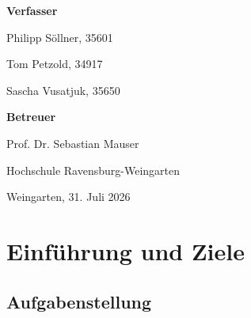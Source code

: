\documentclass[a4paper,11pt]{article}
\begin{document}
\begin{titlepage}
\begin{minipage}[t]{0.52\textwidth}
  \textbf{Verfasser}\par
  \vspace{0.3cm}

  Philipp Söllner, 35601\par
  \vspace{0.2cm}

  Tom Petzold, 34917\par
  \vspace{0.2cm}

  Sascha Vusatjuk, 35650\par
\end{minipage}
\hfill
\begin{minipage}[t]{0.42\textwidth}
  \raggedright
  \large

  \textbf{Betreuer}\par
  \vspace{0.3cm}

  Prof. Dr. Sebastian Mauser\par
  Hochschule Ravensburg-Weingarten\par
\end{minipage}

\vfill

\begin{center}
  {\large Weingarten, 31. Juli 2026}
\end{center}

\end{titlepage}

\hypersetup{pageanchor=true}






\thispagestyle{plain}
\tableofcontents
\clearpage

\setcounter{page}{1}






\section{Einführung und Ziele}

\subsection{Aufgabenstellung}
\end{document}
